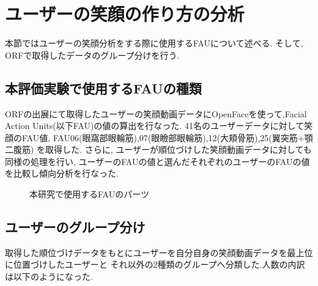 \section{ユーザーの笑顔の作り方の分析}
本節ではユーザーの笑顔分析をする際に使用するFAUについて述べる.
そして, ORFで取得したデータのグループ分けを行う.

\subsection{本評価実験で使用するFAUの種類}
ORFの出展にて取得したユーザーの笑顔動画データにOpenFaceを使って,Facial Action Units(以下FAU)の値の算出を行なった.
41名のユーザーデータに対して笑顔のFAU値, FAU06(眼窩部眼輪筋),07(眼瞼部眼輪筋),12(大頬骨筋),25(翼突筋+顎二腹筋)
を取得した. さらに, ユーザーが順位づけした笑顔動画データに対しても同様の処理を行い,
ユーザーのFAUの値と選んだそれぞれのユーザーのFAUの値を比較し傾向分析を行なった.

\begin{figure}[htbp]
    \begin{center}
    \end{center}
    \caption{本研究で使用するFAUのパーツ}
    \label{fig:fau_smile}
\end{figure}

\subsection{ユーザーのグループ分け}
取得した順位づけデータをもとにユーザーを自分自身の笑顔動画データを最上位に位置づけしたユーザーと
それ以外の2種類のグループへ分類した.人数の内訳は以下のようになった.

